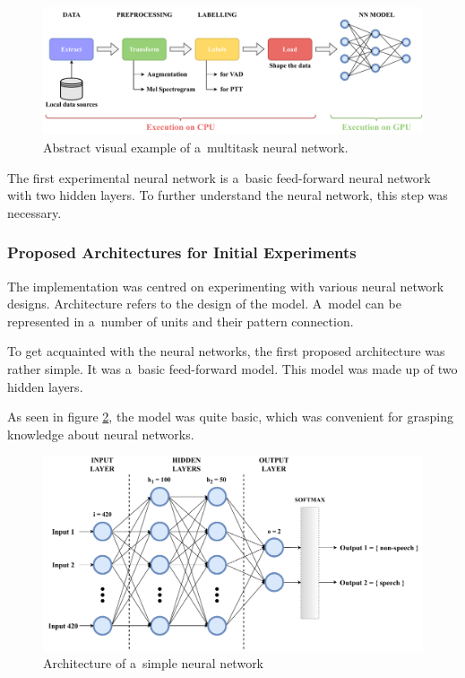     \begin{figure}[ht!]
        \centering
        \includegraphics[width = \textwidth]{obrazky-figures/pipeline.pdf}
        \caption{Abstract visual example of a~multitask neural network.}
        \label{fig:pipeline}
    \end{figure}

    The first experimental neural network is a~basic feed-forward neural network with two hidden layers. To further understand the neural network, this step was necessary. 
    
    

\subsubsection{Proposed Architectures for Initial Experiments}\label{ENNarch}

    The implementation was centred on experimenting with various neural network designs. 
    Architecture refers to the design of the model. A~model can be represented in a~number of units and their pattern connection.
    
    To get acquainted with the neural networks, the first proposed architecture was rather simple. It was a~basic feed-forward model.
    This model was made up of two hidden layers. 
    
    As seen in figure \ref{fig:NN}, the model was quite basic, which was convenient for grasping knowledge about neural networks.

    \begin{figure}[ht!]
        \centering
        \includegraphics[width = \textwidth]{obrazky-figures/NN1.pdf}
        \caption{Architecture of a~simple neural network}
        \label{fig:NN}
    \end{figure}

